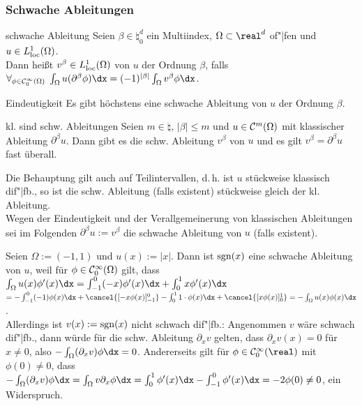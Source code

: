 \subsubsection{%
    Schwache Ableitungen%
}

\begin{Def}{schwache Ableitung}
    Seien $\beta \in \natural_0^d$ ein Multiindex, $\Omega \subset \real^d$ of"|fen und
    $u \in L^1_{\text{loc}}(\Omega)$.\\
    Dann heißt $v^\beta \in L^1_{\text{loc}}(\Omega)$  von $u$
    der Ordnung $\beta$, falls\\
    $\forall_{\phi \in \C^\infty_0(\Omega)}\; \int_\Omega u (\partial^\beta \phi) \dx
    = (-1)^{|\beta|} \int_\Omega v^\beta \phi \dx$.
\end{Def}

\begin{Satz}{Eindeutigkeit}
    Es gibt höchstens eine schwache Ableitung von $u$ der Ordnung $\beta$.
\end{Satz}

\begin{Satz}{kl. sind schw. Ableitungen}
    Seien $m \in \natural$, $|\beta| \le m$ und $u \in \mathcal{C}^m(\Omega)$ mit
    klassischer Ableitung $\partial^\beta u$.
    Dann gibt es die schw. Ableitung $v^\beta$ von $u$
    und es gilt $v^\beta = \partial^\beta u$ fast überall.
\end{Satz}

\begin{Bem}
    Die Behauptung gilt auch auf Teilintervallen, d.\,h. ist $u$ stückweise klassisch
    dif"|fb., so ist die schw. Ableitung (falls existent) stückweise gleich der
    kl. Ableitung.\\
    Wegen der Eindeutigkeit und der Verallgemeinerung von klassischen Ableitungen sei
    im Folgenden $\partial^\beta u := v^\beta$ die schwache Ableitung von $u$
    (falls existent).
\end{Bem}

\linie

\begin{Bsp}
    Seien $\Omega := (-1, 1)$ und $u(x) := |x|$.
    Dann ist $\operatorname{sgn}(x)$ eine schwache Ableitung von $u$, weil für $\phi \in \mathcal{C}^\infty_0(\Omega)$
    gilt, dass $\int_\Omega u(x) \phi'(x) \dx
    = \int_{-1}^0 (-x) \phi'(x) \dx + \int_0^1 x \phi'(x) \dx$\\
    $= -\int_{-1}^0 (-1) \phi(x) \dx + \cancel{[-x \phi(x)]_{-1}^0} -
    \int_0^1 1 \cdot \phi(x) \dx + \cancel{[x \phi(x)]_0^1}
    = -\int_\Omega u(x) \phi(x) \dx$.\\
    Allerdings ist $v(x) := \operatorname{sgn}(x)$ nicht schwach dif"|fb.:
    Angenommen $v$ wäre schwach dif"|fb., dann würde für die schw. Ableitung $\partial_x v$
    gelten, dass $\partial_x v(x) = 0$ für $x \not= 0$,
    also $-\int_\Omega (\partial_x v) \phi \dx = 0$.
    Andererseits gilt für $\phi \in \C^\infty_0(\real)$ mit $\phi(0) \not= 0$, dass\\
    $-\int_\Omega (\partial_x v) \phi \dx = \int_\Omega v \partial_x \phi \dx
    = \int_0^1 \phi'(x) \dx - \int_{-1}^0 \phi'(x) \dx = -2\phi(0) \not= 0$, ein Widerspruch.
\end{Bsp}

